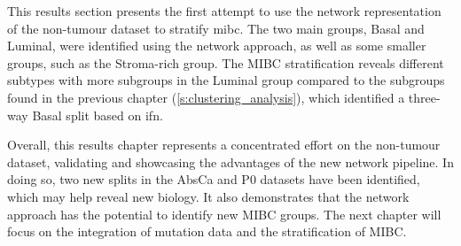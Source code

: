 This results section presents the first attempt to use the network representation of the non-tumour dataset to stratify \acrfull{mibc}. The two main groups, Basal and Luminal, were identified using the network approach, as well as some smaller groups, such as the Stroma-rich group. The MIBC stratification reveals different subtypes with more subgroups in the Luminal group compared to the subgroups found in the previous chapter (\cref{s:clustering_analysis}), which identified a three-way Basal split based on \acrfull{ifn}.


Overall, this results chapter represents a concentrated effort on the non-tumour dataset, validating and showcasing the advantages of the new network pipeline. In doing so, two new splits in the AbsCa and P0 datasets have been identified, which may help reveal new biology. It also demonstrates that the network approach has the potential to identify new MIBC groups. The next chapter will focus on the integration of mutation data and the stratification of MIBC.

